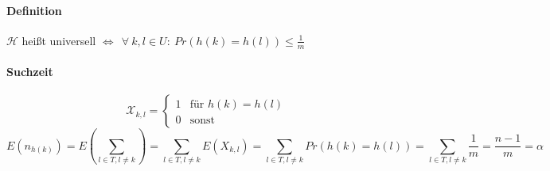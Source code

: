 \paragraph*{Definition} $\mathcal{H}$ heißt universell $\Leftrightarrow~~\forall~k,l\in U:~ Pr(h(k)=h(l))\leq \frac{1}{m}$
\paragraph*{Suchzeit}
\[ \mathcal{X}_{k,l}=\begin{cases}1&\text{für }h(k)=h(l)\\0&\text{sonst}\end{cases} \]
\[ E(n_{h(k)})=E\left( \sum_{l \in T, l \neq k} \right) =  \sum_{l \in T, l \neq k} E(X_{k,l}) =  \sum_{l \in T, l \neq k} Pr(h(k)=h(l)) = \sum_{l \in T, l \neq k} \frac{1}{m} = \frac{n-1}{m} = \alpha \] 